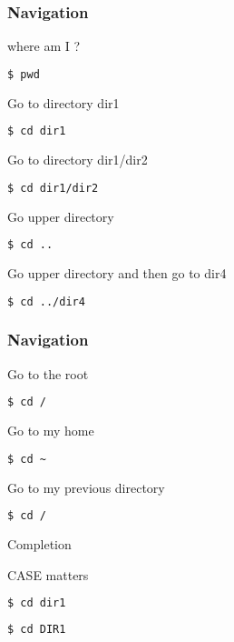 \documentclass{beamer}
\begin{document}
\begin{frame}[fragile]
\frametitle{Navigation}

where am I ?
\begin{lstlisting}[language=bash]
$ pwd
\end{lstlisting}

Go to directory dir1
\begin{lstlisting}[language=bash]
$ cd dir1
\end{lstlisting}

Go to directory dir1/dir2
\begin{lstlisting}[language=bash]
$ cd dir1/dir2
\end{lstlisting}


Go upper directory
\begin{lstlisting}[language=bash]
$ cd ..
\end{lstlisting}

Go upper directory and then go to dir4
\begin{lstlisting}[language=bash]
$ cd ../dir4
\end{lstlisting}


\end{frame}

\begin{frame}[fragile]
\frametitle{Navigation}

Go to the root
\begin{lstlisting}[language=bash]
$ cd /
\end{lstlisting}

Go to my home
\begin{lstlisting}[language=bash]
$ cd ~
\end{lstlisting}

Go to my previous directory
\begin{lstlisting}[language=bash]
$ cd /
\end{lstlisting}

\end{frame}


\begin{frame}[fragile]
 \begin{center}
    \huge{Completion}\\
  \end{center}
\end{frame}


\begin{frame}[fragile]
 \begin{center}
    \huge{CASE matters}\\
    \end{center}
\begin{lstlisting}[language=bash]
$ cd dir1
\end{lstlisting}


\begin{lstlisting}[language=bash]
$ cd DIR1
\end{lstlisting}

\end{frame}
\end{document}
